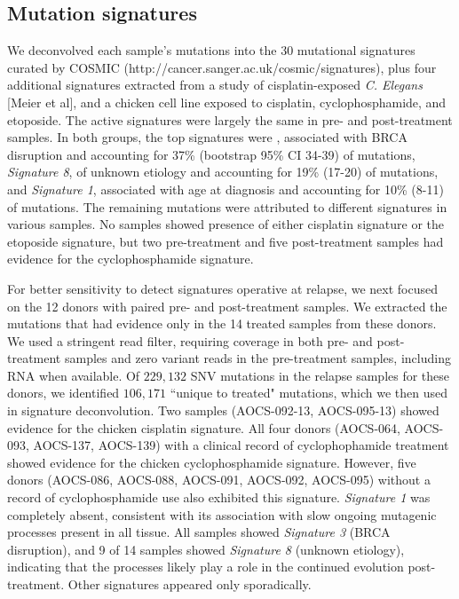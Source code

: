 \subsection*{Mutation signatures}
We deconvolved each sample's mutations into the 30 mutational signatures curated by COSMIC (http://cancer.sanger.ac.uk/cosmic/signatures), plus four additional signatures extracted from a study of cisplatin-exposed \textit{C. Elegans} [Meier et al], and a chicken cell line exposed to cisplatin, cyclophosphamide, and etoposide\cite{Szikriszt_2016}. The active signatures were largely the same in pre- and post-treatment samples. In both groups, the top signatures were , associated with BRCA disruption and accounting for 37\% (bootstrap 95\% CI 34-39) of mutations, \textit{Signature 8}, of unknown etiology and accounting for 19\% (17-20) of mutations, and \textit{Signature 1}, associated with age at diagnosis and accounting for 10\% (8-11) of mutations. The remaining mutations were attributed to different signatures in various samples. No samples showed presence of either cisplatin signature or the etoposide signature, but two pre-treatment and five post-treatment samples had evidence for the cyclophosphamide signature.

For better sensitivity to detect signatures operative at relapse, we next focused on the 12 donors with paired pre- and post-treatment samples. We extracted the mutations that had evidence only in the 14 treated samples from these donors. We used a stringent read filter, requiring coverage in both pre- and post-treatment samples and zero variant reads in the pre-treatment samples, including RNA when available. Of $229,132$ SNV mutations in the relapse samples for these donors, we identified $106,171$ ``unique to treated" mutations, which we then used in signature deconvolution. Two samples (AOCS-092-13, AOCS-095-13) showed evidence for the chicken cisplatin signature. All four donors (AOCS-064, AOCS-093, AOCS-137, AOCS-139) with a clinical record of cyclophophamide treatment showed evidence for the chicken cyclophosphamide signature. However, five donors (AOCS-086, AOCS-088, AOCS-091, AOCS-092, AOCS-095) without a  record of cyclophosphamide use also exhibited this signature. \textit{Signature 1} was completely absent, consistent with its association with slow ongoing mutagenic processes present in all tissue. All samples showed \textit{Signature 3} (BRCA disruption), and 9 of 14 samples showed \textit{Signature 8} (unknown etiology), indicating that the processes likely play a role in the continued evolution post-treatment. Other signatures appeared only sporadically.


